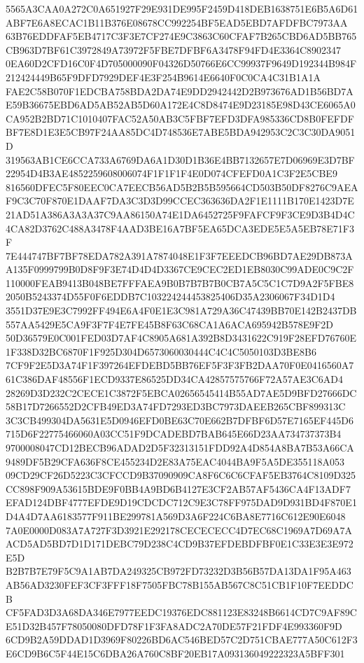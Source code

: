\documentclass[UTF8,fontset=fandol,zihao=-4,a4paper]{ctexart}
\begin{document}
{{5565A3CAA0A272C0A651927F29E931DE995F2459D418DEB1638751E6B5A6D61ABF7E6A8ECAC1B11B376E08678CC992254BF5EAD5EBD7AFDFBC7973AA
63B76EDDFAF5EB4717C3F3E7CF274E9C3863C60CFAF7B265CBD6AD5BB765CB963D7BF61C3972849A73972F5FBE7DFBF6A3478F94FD4E3364C8902347
0EA60D2CFD16C0F4D705000090F04326D50766E6CC99937F9649D192344B984F212424449B65F9DFD7929DEF4E3F254B9614E6640F0C0CA4C31B1A1A
FAE2C58B070F1EDCBA758BDA2DA74E9DD2942442D2B973676AD1B56BD7AE59B36675EBD6AD5AB52AB5D60A172E4C8D8474E9D23185E98D43CE6065A0
CA952B2BD71C1010407FAC52A50AB3C5FBF7EFD3DFA985336CD8B0FEFDFBF7E8D1E3E5CB97F24AA85DC4D748536E7ABE5BDA942953C2C3C30DA9051D
319563AB1CE6CCA733A6769DA6A1D30D1B36E4BB7132657E7D06969E3D7BF22954D4B3AE4852259608006074F1F1F1F4E0D074CFEFD0A1C3F2E5CBE9
816560DFEC5F80EEC0CA7EECB56AD5B2B5B595664CD503B50DF8276C9AEAF9C3C70F870E1DAAF7DA3C3D3D99CCEC363636DA2F1E1111B170E1423D7E
21AD51A386A3A3A37C9AA86150A74E1DA6452725F9FAFCF9F3CE9D3B4D4C4CA82D3762C488A3478F4AAD3BE16A7BF5EA65DCA3EDE5E5A5EB78E71F3F
7E444747BF7BF78EDA782A391A7874048E1F3F7EEEDCB96BD7AE29DB873AA135F0999799B0D8F9F3E74D4D4D3367CE9CEC2ED1EB8030C99ADE0C9C2F
110000FEAB9413B048BE7FFFAEA9B0B7B7B7B0CB7A5C5C1C7D9A2F5FBE82050B5243374D55F0F6EDDB7C103224244453825406D35A2306067F34D1D4
3551D37E9E3C7992FF494E6A4F0E1E3C981A729A36C47439BB70E142B2437DB557AA5429E5CA9F3F7F4E7FE45B8F63C68CA1A6ACA695942B578E9F2D
50D36579E0C001FED03D7AF4C8905A681A392B8D3431622C919F28EFD76760E1F338D32BC6870F1F925D304D6573060030444C4C4C5050103D3BE8B6
7CF9F2E5D3A74F1F397264EFDEBD5BB76EF5F3F3FB2DAA70F0E0416560A761C386DAF48556F1ECD9337E86525DD34CA42857575766F72A57AE3C6AD4
28269D3D232C2CECE1C3872F5EBCA02656545414B55AD7AE5D9BFD27666DC58B17D7266552D2CFB49ED3A74FD7293ED3BC7973DAEEB265CBF899313C
3C3CB499304DA5631E5D0946EFD0BE63C70E662B7DFBF6D57E7165EF445D6715D6F22775466060A03CC51F9DCADEBD7BAB645E66D23AA734737373B4
9700008047CD12BECB96ADAD2D5F32313151FDD92A4D854A8BA7B53A66CA9489DF5B29CFA636F8CE455234D2E83A75EAC4044BA9F5A5DE355118A053
09CD29CF26D5223C3CFCCD9B37090909CA8F6C6C6CFAF5EB3764C8109D325CC898F909A53615BDE9F0BB4A9BD6B4127E3CF2AB57AF5436CA4F13ADF7
EFAD124DBF4777EFDE9D19CDCDC712C9E3C78FF975DAD9D931BD4F870E1D4A4D7AA6183577F911BE299781A569D3A6F224C6BA8E7716C612E90E6048
7A0E0000D083A7A727F3D3921E292178CECECECC4D7EC68C1969A7D69A7AACD5AD5BD7D1D171DEBC79D238C4CD9B37EFDEBDFBF0E1C33E3E3E972E5D
B2B7B7E79F5C9A1AB7DA249325CB972FD73232D3B56B57DA13DA1F95A463AB56AD3230FEF3CF3FFF18F7505FBC78B155AB567C8C51CB1F10F7EEDDCB
CF5FAD3D3A68DA346E7977EEDC19376EDC881123E83248B6614CD7C9AF89CE51D32B457F78050080DFD78F1F3FA8ADC2A70DE57F21FDF4E993360F9D
6CD9B2A59DDAD1D3969F80226BD6AC546BED57C2D751CBAE777A50C612F3E6CD9B6C5F44E15C6DBA26A760C8BF20EB17A093136049222323A5BFF301
}}
\end{document}
